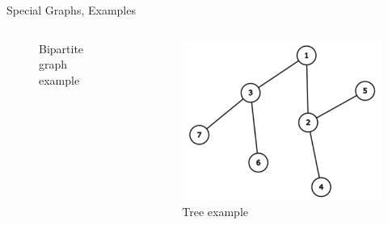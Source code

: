 \documentclass[aspectratio=169]{beamer}%
\begin{document}
\begin{frame}{Special Graphs, Examples}
\begin{columns}[T]
\begin{column}{.32\textwidth}
\begin{figure}
                \caption{Bipartite graph example}%
            \end{figure}%
        \end{column}%
        \hfill
        \begin{column}{.32\textwidth}%
            \begin{figure}%
                \centering%
                \includegraphics[width=.9\linewidth]{tree1.png}%
                \caption{Tree example}%
            \end{figure}%
        \end{column}%
    \end{columns}%
\end{frame}
\end{document}
